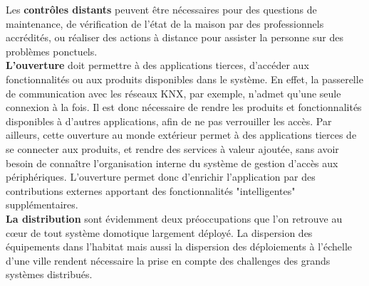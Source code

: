 Les {\bf contrôles distants} peuvent être nécessaires pour des questions de maintenance, de vérification de l'état de la maison par des professionnels accrédités, ou réaliser des actions à distance pour assister la personne sur des problèmes ponctuels.\\




{\bf L'ouverture} doit permettre à des applications tierces, d'accéder aux fonctionnalités ou aux produits disponibles dans le système. En effet, la passerelle de communication avec les réseaux KNX, par exemple, n'admet qu'une seule connexion à la fois. Il est donc nécessaire de rendre les produits et fonctionnalités disponibles à d'autres applications, afin de ne pas verrouiller les accès. Par ailleurs, cette ouverture au monde extérieur permet à des applications tierces de se connecter aux produits, et rendre des services à valeur ajoutée, sans avoir besoin de connaître l'organisation interne du système de gestion d'accès aux périphériques. L'ouverture permet donc d'enrichir l'application par des contributions externes apportant des fonctionnalités "intelligentes" supplémentaires.\\

{\bf La distribution} sont évidemment deux préoccupations que l'on retrouve au c\oe ur de tout système domotique largement déployé. La dispersion des équipements dans l'habitat mais aussi la dispersion des déploiements à l'échelle d'une ville rendent nécessaire la prise en compte des challenges des grands systèmes distribués.\\



